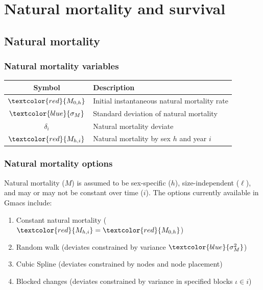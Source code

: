 \documentclass{beamer}
\begin{document}

\section{Natural mortality and survival}


\subsection{Natural mortality}
\begin{frame}
\frametitle{Natural mortality variables}
\begin{table}
  \centering
  \begin{tabular}{cl}
  \hline
  Symbol  & Description \\
  \hline
      $\textcolor{red}{M_{0,h}}$ & Initial instantaneous natural mortality rate \\
      $\textcolor{blue}{\sigma_M}$ & Standard deviation of natural mortality \\
      $\delta_i$ & Natural mortality deviate \\
      $\textcolor{red}{M_{h,i}}$ & Natural mortality by sex $h$ and year $i$ \\
  \hline
  \end{tabular}
\end{table}
\end{frame}


\begin{frame}
\frametitle{Natural mortality options}
Natural mortality ($M$) is assumed to be sex-specific ($h$), size-independent
($\ell$), and may or may not be constant over time ($i$). The options currently
available in Gmacs include:
\begin{enumerate}
\item Constant natural mortality ($\textcolor{red}{M_{h,i}} = \textcolor{red}{M_{0,h}}$)
\item Random walk (deviates constrained by variance $\textcolor{blue}{\sigma^2_M}$)
\item Cubic Spline (deviates constrained by nodes and node placement)
\item Blocked changes (deviates constrained by variance in specified blocks
  $\iota \in i$)
\end{enumerate}
\end{frame}
\end{document}
